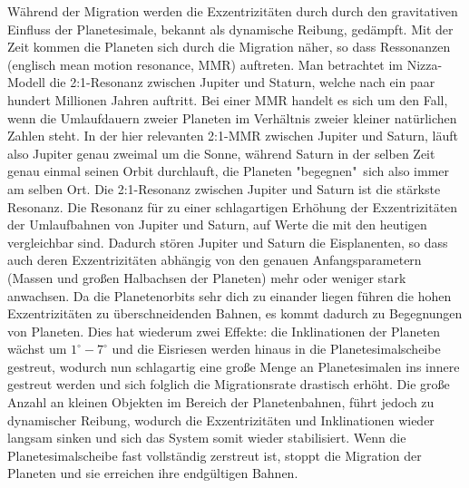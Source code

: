 \documentclass[10pt,a4paper,twoside]{article}
\begin{document}
Während der Migration werden die Exzentrizitäten durch durch den gravitativen Einfluss der Planetesimale, bekannt als dynamische Reibung, gedämpft.\cite{Tsiganis2005}
Mit der Zeit kommen die Planeten sich durch die Migration näher, so dass Ressonanzen (englisch mean motion resonance, MMR) auftreten.
Man betrachtet im Nizza-Modell die 2:1-Resonanz zwischen Jupiter und Staturn, welche nach ein paar hundert Millionen Jahren auftritt.
Bei einer MMR handelt es sich um den Fall, wenn die Umlaufdauern zweier Planeten im Verhältnis zweier kleiner natürlichen Zahlen steht. In der hier relevanten 2:1-MMR zwischen Jupiter und Saturn, läuft also Jupiter genau zweimal um die Sonne, während Saturn in der selben Zeit genau einmal seinen Orbit durchlauft, die Planeten "begegnen"\ sich also immer am selben Ort. %
Die 2:1-Resonanz zwischen Jupiter und Saturn ist die stärkste Resonanz. %
Die Resonanz für zu einer schlagartigen Erhöhung der Exzentrizitäten der Umlaufbahnen von Jupiter und Saturn, auf Werte die mit den heutigen vergleichbar sind. %
Dadurch stören Jupiter und Saturn die Eisplanenten, so dass auch deren Exzentrizitäten abhängig von den genauen Anfangsparametern (Massen und großen Halbachsen der Planeten) mehr oder weniger stark anwachsen\cite{Tsiganis2005}.
Da die Planetenorbits sehr dich zu einander liegen führen die hohen Exzentrizitäten zu überschneidenden Bahnen\cite{Tsiganis2005}, es kommt dadurch zu Begegnungen von Planeten. %
Dies hat wiederum zwei Effekte: die Inklinationen der Planeten wächst um $1^\circ-7^\circ$ und die Eisriesen werden hinaus in die Planetesimalscheibe gestreut,
wodurch nun schlagartig eine große Menge an Planetesimalen ins innere gestreut werden und sich folglich die Migrationsrate drastisch erhöht\cite{Tsiganis2005}.
Die große Anzahl an kleinen Objekten im Bereich der Planetenbahnen, führt jedoch zu dynamischer Reibung, wodurch die Exzentrizitäten und Inklinationen wieder langsam sinken und sich das System somit wieder stabilisiert\cite{Tsiganis2005}.
Wenn die Planetesimalscheibe fast vollständig zerstreut ist, stoppt die Migration der Planeten und sie erreichen ihre endgültigen Bahnen\cite{Tsiganis2005}.



\end{document}
